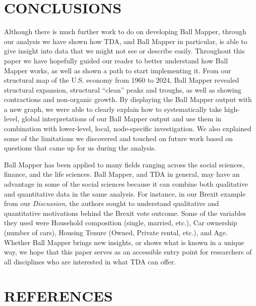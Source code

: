 \documentclass[10pt, letterpaper]{article}
\begin{document}
\section{CONCLUSIONS}\label{conclusions}

Although there is much further work to do on developing Ball Mapper,
through our analysis we have shown how TDA, and Ball Mapper in
particular, is able to give insight into data that we might not see or
describe easily. Throughout this paper we have hopefully guided our
reader to better understand how Ball Mapper works, as well as shown a
path to start implementing it. From our structural map of the U.S.
economy from 1960 to 2024, Ball Mapper revealed structural expansion,
structural ``clean'' peaks and troughs, as well as showing contractions
and non-organic growth. By displaying the Ball Mapper output with a new
graph, we were able to clearly explain how to systematically take
high-level, global interpretations of our Ball Mapper output and use
them in combination with lower-level, local, node-specific
investigation. We also explained some of the limitations we discovered
and touched on future work based on questions that came up for us during
the analysis.

Ball Mapper has been applied to many fields ranging across the social
sciences, finance, and the life sciences. Ball Mapper, and TDA in
general, may have an advantage in some of the social sciences because it
can combine both qualitative and quantitative data in the same analysis.
For instance, in our Brexit example from our \emph{Discussion}, the
authors sought to understand qualitative and quantitative motivations
behind the Brexit vote outcome. Some of the variables they used were
Household composition (single, married, etc.), Car ownership (number of
cars), Housing Tenure (Owned, Private rental, etc.), and Age. Whether
Ball Mapper brings new insights, or shows what is known in a unique way,
we hope that this paper serves as an accessible entry point for
researchers of all disciplines who are interested in what TDA can offer.

\section{REFERENCES}\label{references}
\end{document}
